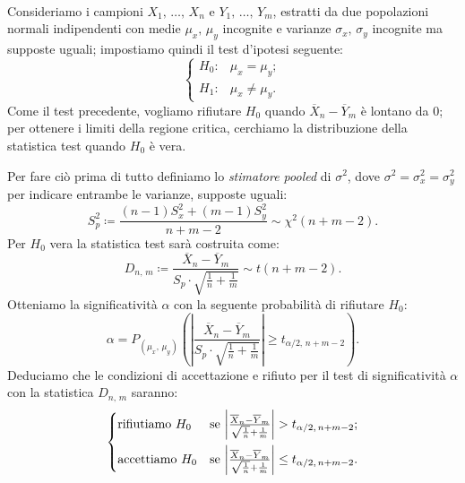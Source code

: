     \begin{defn}[$\mu_x=\mu_y=\,?,\, \sigma^2_x=\sigma^2_y=\,?,\, \sigma^2_x \equiv \sigma^2_y$]
            \hfill \\
            Consideriamo i campioni $X_1,\, \ldots,\, X_{n}$ e $Y_1,\, \ldots,\, Y_{m}$, estratti da due 
            popolazioni normali indipendenti con medie $\mu_x,\, \mu_y$ incognite e varianze 
            $\sigma_x,\, \sigma_y$ incognite ma supposte uguali; impostiamo quindi il test d'ipotesi seguente: \[
            \begin{cases}
                H_0 : & \mu_x = \mu_y; \\
                H_1 : & \mu_x \neq \mu_y.
            \end{cases}
            \] Come il test precedente, vogliamo rifiutare $H_0$ quando $\overline{X}_n -\overline{Y}_m$ è 
            lontano da $0$; per ottenere i limiti della regione critica, cerchiamo la distribuzione della 
            statistica test quando $H_0$ è vera.

            Per fare ciò prima di tutto definiamo lo \emph{stimatore pooled} di $\sigma^2$, dove 
            $\sigma^2 = \sigma^2_x = \sigma^2_y$ per indicare entrambe le varianze, supposte uguali:
            \begin{equation}\label{eq:Stimatore_pooled_varianza}
                S^2_p \coloneqq \frac{(n-1)S_x^2 +(m-1)S_y^2}{n+m-2} \sim \chi^2(n+m-2)
            .\end{equation}
            Per $H_0$ vera la statistica test sarà costruita come: \[
                D_{n,\,m} \coloneqq \frac{\overline{X}_n -\overline{Y}_m}{S_p\cdot \sqrt{\frac{1}{n} +\frac{1}{m}}} 
                \sim t(n+m-2)
            .\] Otteniamo la significatività $\alpha$ con la seguente probabilità di rifiutare $H_0$: \[
                \alpha = P_{(\mu_x,\,\mu_y)}\left(\left|\frac{\overline{X}_n -\overline{Y}_m}{S_p 
                \cdot \sqrt{\frac{1}{n} +\frac{1}{m}}}\right| \geq t_{\alpha /2,\,n+m-2}\right)
            .\] Deduciamo che le condizioni di accettazione e rifiuto per il test di significatività $\alpha$ 
            con la statistica $D_{n,\,m}$ saranno: \[
            \begin{cases}
                \text{rifiutiamo } H_0 & 
                \text{se $\left|\frac{\overline{X}_n -\overline{Y}_m}{\sqrt{\frac{1}{n}} 
                +\frac{1}{m}}\right| > t_{\alpha /2,\,n+m-2}$;} \\
                \vspace{-1em} \\
                \text{accettiamo } H_0 & 
                \text{se $\left|\frac{\overline{X}_n -\overline{Y}_m}{\sqrt{\frac{1}{n}} 
                +\frac{1}{m}}\right| \leq t_{\alpha /2,\,n+m-2}$.}
            \end{cases}
            \]
        \end{defn}
